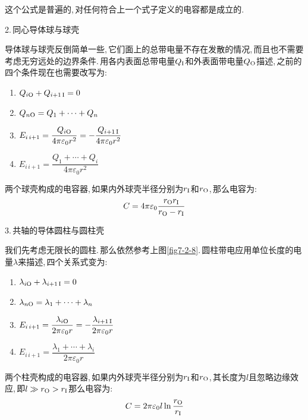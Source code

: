这个公式是普遍的,\,对任何符合上一个式子定义的电容都是成立的.

\vspace{1cm}
2.\,同心导体球与球壳

导体球与球壳反倒简单一些,\,它们面上的总带电量不存在发散的情况,\,而且也不需要考虑无穷远处的边界条件.\,用各内表面总带电量$Q_{\rm I}$和外表面带电量$Q_{\rm O}$描述,\,之前的四个条件现在也需要改写为:
\begin{center}\begin{minipage}{0.35\textwidth}
\begin{enumerate}
\item $Q_{i{\rm O}} +Q_{i+1\,{\rm I}}=0$
\item $Q_{n{\rm O}}=Q_1+\cdots+Q_n$
\item $E_{i\,i+1}=\dfrac{Q_{i{\rm O}}}{4\pi \varepsilon_0r^2}=-\dfrac{Q_{i+1\,{\rm I}}}{4\pi \varepsilon_0r^2}$
\item $E_{i\,i+1}=\dfrac{Q_1+\cdots+Q_i}{4\pi\varepsilon_0 r^2}$
\end{enumerate}
\end{minipage}\end{center}


两个球壳构成的电容器,\,如果内外球壳半径分别为$r_{\rm I}$和$r_{\rm O}$,\,那么电容为:
\[C=4\pi\varepsilon_0\frac{r_{\rm O}r_{\rm I}}{r_{\rm O}-r_{\rm I}}\]

\vspace{0.5cm}
3.\,共轴的导体圆柱与圆柱壳

我们先考虑无限长的圆柱.\,那么依然参考上图\ref{fig7-2-8}.\,圆柱带电应用单位长度的电量$\lambda$来描述,\,四个关系式变为:

\begin{center}\begin{minipage}{0.35\textwidth}
\begin{enumerate}
\item $\lambda_{i{\rm O}} +\lambda_{i+1\,{\rm I}}=0$
\item $\lambda_{n{\rm O}}=\lambda_1+\cdots+\lambda_n$
\item $E_{i\,i+1}=\dfrac{\lambda_{i{\rm O}}}{2\pi \varepsilon_0r}=-\dfrac{\lambda_{i+1\,{\rm I}}}{2\pi \varepsilon_0r}$
\item $E_{i\,i+1}=\dfrac{\lambda_1+\cdots+\lambda_i}{2\pi\varepsilon_0 r}$
\end{enumerate}
\end{minipage}\end{center}

两个柱壳构成的电容器,\,如果内外球壳半径分别为$r_{\rm I}$和$r_{\rm O}$,\,其长度为$l$且忽略边缘效应,\,即$l\gg r_{\rm O}>r_{\rm I}$那么电容为:
\[C=2\pi\varepsilon_0l\ln\frac{r_{\rm O}}{r_{\rm I}}\]

